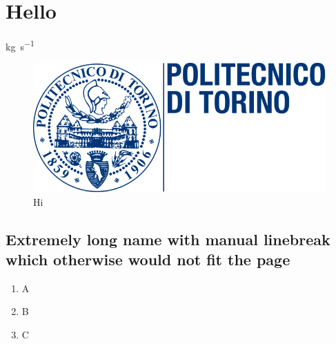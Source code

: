 \chapter{Hello}
\label{sec:hello}

\cite[Hi][Goofy]{IEEEexample:article_typical}

\si{\kilo\gram\per\second}

\begin{figure}[h]
\centering
\includegraphics[width=.9\linewidth]{images/logo/logoPoliTo_with_name_wrong.png}
\caption{Hi}
\label{fig:hi}
\end{figure}

\section[Extremely long name with manual linebreak which otherwise would not fit the page]{Extremely long name with manual linebreak\\which otherwise would not fit the page} %

\begin{enumerate}
    \item A
    \item B
    \item C
\end{enumerate}

